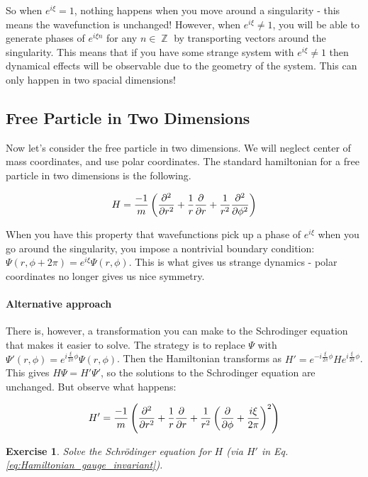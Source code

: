 \documentclass{article}
\newtheorem{exercise}{Exercise}[section]
\DeclareMathOperator{\ZZ}{\mathbb{Z}}
\begin{document}
So when $e^{i\xi}=1$, nothing happens when you move around a singularity - this means the wavefunction is unchanged! However, when $e^{i\xi}\neq 1$, you will be able to generate phases of $e^{i\xi n}$ for any $n \in \ZZ$ by transporting vectors around the singularity. This means that if you have some strange system with $e^{i\xi}\neq 1$ then dynamical effects will be observable due to the geometry of the system. This can only happen in two spacial dimensions!

\subsection{Free Particle in Two Dimensions}

Now let's consider the free particle in two dimensions. We will neglect center of mass coordinates, and use polar coordinates. The standard hamiltonian for a free particle in two dimensions is the following.

\begin{equation}
H = \frac{-1}{m}\left(\pdv[2]{r}+\frac{1}{r}\pdv{r}+ \frac{1}{r^2}\pdv[2]{\phi}\right)
\end{equation}

When you have this property that wavefunctions pick up a phase of $e^{i\xi}$ when you go around the singularity, you impose a nontrivial boundary condition: $\Psi(r,\phi+2\pi) = e^{i\xi}\Psi(r,\phi)$. This is what gives us strange dynamics - polar coordinates no longer gives us nice symmetry. 

\paragraph*{Alternative approach}

There is, however, a transformation you can make to the Schrodinger equation that makes it easier to solve. The strategy is to replace $\Psi$ with $\Psi'(r,\phi) = e^{i\frac{\xi}{2\pi}\phi}\Psi(r,\phi)$. Then the Hamiltonian transforms as $H' = e^{-i\frac{\xi}{2\pi}\phi}H e^{i\frac{\xi}{2\pi}\phi}$. This gives $H\Psi = H'\Psi'$, so the solutions to the Schrodinger equation are unchanged. But observe what happens:

\begin{equation}
H' = \frac{-1}{m}\left(\pdv[2]{r}+\frac{1}{r}\pdv{r}+ \frac{1}{r^2}\left(\pdv{\phi}+\frac{i\xi}{2\pi}\right)^2\right)
\label{eq:Hamiltonian_gauge_invariant}
\end{equation}

\begin{exercise}
	Solve the Schr\"odinger equation for $ H $ (via $ H' $ in Eq. \eqref{eq:Hamiltonian_gauge_invariant}).
\end{exercise}
\end{document}
